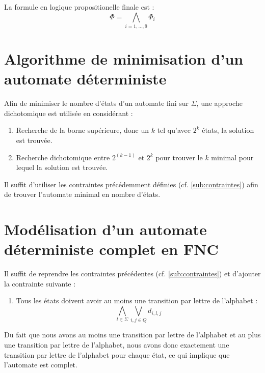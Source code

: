 \documentclass[a4paper, 12pt]{extarticle}
\begin{document}
La formule en logique propositionelle finale est :
\begin{equation*}
    \Phi=\bigwedge_{i=1,\dots,9} \Phi_i
\end{equation*}

\section{Algorithme de minimisation d'un automate déterministe}
\label{sec:algo_minimisation}
\noindent Afin de minimiser le nombre d'états d'un automate fini sur $\Sigma$, une approche dichotomique est utilisée en considérant :
\begin{enumerate}
    \item Recherche de la borne supérieure, donc un $k$ tel qu'avec $2^k$ états, la solution est trouvée.
    \item Recherche dichotomique entre $2^{(k-1)}$ et $2^k$ pour trouver le $k$ minimal pour lequel la solution est trouvée.
\end{enumerate}
Il suffit d'utiliser les contraintes précédemment définies (cf. \ref{sub:contraintes}) afin de trouver
l'automate minimal en nombre d'états.

\section{Modélisation d'un automate déterministe complet en FNC} 
\label{sec:automate_deterministe_complet}
\noindent Il suffit de reprendre les contraintes précédentes (cf. \ref{sub:contraintes}) et d'ajouter la
contrainte suivante :
\begin{enumerate}
    \item Tous les états doivent avoir au moins une transition par lettre de l'alphabet :
    \begin{equation*}
        \bigwedge_{l \in \Sigma} \bigvee_{i,j\in Q} d_{i,l,j}
    \end{equation*}
\end{enumerate}
Du fait que nous avons au moins une transition par lettre de l'alphabet et au plus une transition par lettre de l'alphabet,
nous avons donc exactement une transition par lettre de l'alphabet pour chaque état, ce qui implique que l'automate est complet.
\end{document}
